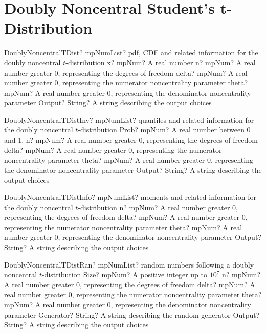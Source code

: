 \documentclass[12pt,a4paper,openany]{book}
\begin{document}
\section{Doubly Noncentral Student's t-Distribution}

\begin{mpFunctionsExtract}
\mpFunctionFiveNotImplemented
{DoublyNoncentralTDist? mpNumList? pdf, CDF and related information for the doubly noncentral $t$-distribution}
{x? mpNum? A real number}
{n? mpNum? A real number greater 0, representing the degrees of freedom}
{delta? mpNum? A real number greater 0, representing the numerator noncentrality parameter}
{theta? mpNum? A real number greater 0, representing the denominator noncentrality parameter}
{Output? String? A string describing the output choices}
\end{mpFunctionsExtract}

\begin{mpFunctionsExtract}
\mpFunctionFiveNotImplemented
{DoublyNoncentralTDistInv? mpNumList? quantiles and related information for the  doubly noncentral $t$-distribution}
{Prob? mpNum? A real number between 0 and 1.}
{n? mpNum? A real number greater 0, representing the degrees of freedom}
{delta? mpNum? A real number greater 0, representing the numerator noncentrality parameter}
{theta? mpNum? A real number greater 0, representing the denominator noncentrality parameter}
{Output? String? A string describing the output choices}
\end{mpFunctionsExtract}

\begin{mpFunctionsExtract}
\mpFunctionFourNotImplemented
{DoublyNoncentralTDistInfo? mpNumList? moments and related information for the doubly noncentral $t$-distribution}
{n? mpNum? A real number greater 0, representing the degrees of freedom}
{delta? mpNum? A real number greater 0, representing the numerator noncentrality parameter}
{theta? mpNum? A real number greater 0, representing the denominator noncentrality parameter}
{Output? String? A string describing the output choices}
\end{mpFunctionsExtract}

\begin{mpFunctionsExtract}
\mpFunctionSixNotImplemented
{DoublyNoncentralTDistRan? mpNumList? random numbers following a doubly noncentral $t$-distribution}
{Size? mpNum? A positive integer up to $10^7$}
{n? mpNum? A real number greater 0, representing the degrees of freedom}
{delta? mpNum? A real number greater 0, representing the numerator noncentrality parameter}
{theta? mpNum? A real number greater 0, representing the denominator noncentrality parameter}
{Generator? String? A string describing the random generator}
{Output? String? A string describing the output choices}
\end{mpFunctionsExtract}
\end{document}

